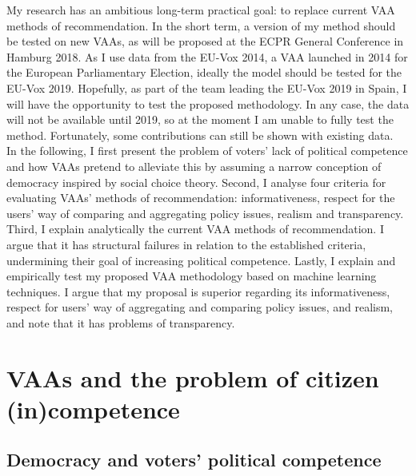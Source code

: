 \documentclass{scrartcl}
\begin{document}
My research has an ambitious long-term practical goal: to replace current VAA methods of recommendation. In the short term, a version of my method should be tested on new VAAs, as will be proposed at the ECPR General Conference in Hamburg 2018. As I use data from the EU-Vox 2014, a VAA launched in 2014 for the European Parliamentary Election, ideally the model should be tested for the EU-Vox 2019. Hopefully, as part of the team leading the EU-Vox 2019 in Spain, I will have the opportunity to test the proposed methodology. In any case, the data will not be available until 2019, so at the moment I am unable to fully test the method. Fortunately, some contributions can still be shown with existing data. 
\\

In the following, I first present the problem of voters' lack of political competence and how VAAs pretend to alleviate this by assuming a narrow conception of democracy inspired by social choice theory. Second, I analyse four criteria for evaluating VAAs' methods of recommendation: informativeness, respect for the users' way of comparing and aggregating policy issues, realism and transparency. Third, I explain analytically the current VAA methods of recommendation. I argue that it has structural failures in relation to the established criteria, undermining their goal of increasing political competence. Lastly, I explain and empirically test my proposed VAA methodology based on machine learning techniques. I argue that my proposal is superior regarding its informativeness, respect for users' way of aggregating and comparing policy issues, and realism, and note that it has problems of transparency.    


\section{VAAs and the problem of citizen (in)competence} 

\subsection{Democracy and voters' political competence}
\end{document}
